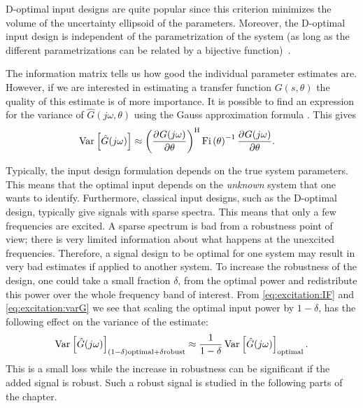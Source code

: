 \begin{remark}
D-optimal input designs are quite popular since this criterion minimizes the volume of the uncertainty ellipsoid of the parameters.
Moreover, the D-optimal input design is independent of the parametrization of the system (as long as the different parametrizations can be related by a bijective function)~\citep[Chapter 6]{Goodwin1977}.
\end{remark}

The information matrix tells us how good the individual parameter estimates are. However, if we are interested in estimating a transfer function $G(s,\theta)$ the quality of this estimate is of more importance. 
It is possible to find an expression for the variance of $\hat{G}(j\omega,\theta)$ using the Gauss approximation formula \citep{Ljung1999, Pintelon2012}. This gives
\begin{align}
\operatorname{\mathrm{Var}}_{} \left[ \hat{G}(j\omega) \right] &
  \approx 
  \left(\frac{{\partial}^{} G(j\omega)}{\partial \theta}\right)^{\mathrm{H}}
  \mathrm{Fi} \left(\theta\right)^{-1}
  \frac{{\partial}^{} G(j\omega)}{\partial \theta}
\label{eq:excitation:varG}
\text{.}
\end{align}

Typically, the input design formulation depends on the true system parameters. This means that the optimal input depends on the \emph{unknown} system that one wants to identify. 
Furthermore, classical input designs, such as the D-optimal design, typically give signals with sparse spectra. 
This means that only a few frequencies are excited. 
A sparse spectrum is bad from a robustness point of view; there is very limited information about what happens at the unexcited frequencies. 
Therefore, a signal design to be optimal for one system may result in very bad estimates if applied to another system.
To increase the robustness of the design, one could take a small fraction $\delta$, from the optimal power and redistribute this power over the whole frequency band of interest.
From \eqref{eq:excitation:IF} and \eqref{eq:excitation:varG} we see that scaling the optimal input power by $1-\delta$, has the following effect on the variance of the estimate:
\begin{align}
\operatorname{\mathrm{Var}}_{} \left[ \hat{G}(j\omega) \right]_{{(1-\delta)\mathrm{optimal} + \delta \mathrm{robust}}} \approx \frac{1}{1-\delta} \operatorname{\mathrm{Var}}_{} \left[ \hat{G}(j\omega) \right]_{\mathrm{optimal}} 
\text{.}
\end{align}
This is a small loss while the increase in robustness can be significant if the added signal is robust. 
Such a robust signal is studied in the following parts of the chapter.


